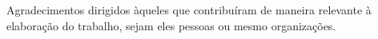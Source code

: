 \begin{agradecimentos}
Agradecimentos dirigidos àqueles que contribuíram de maneira relevante à elaboração do trabalho, sejam eles pessoas ou mesmo organizações.
\end{agradecimentos}
